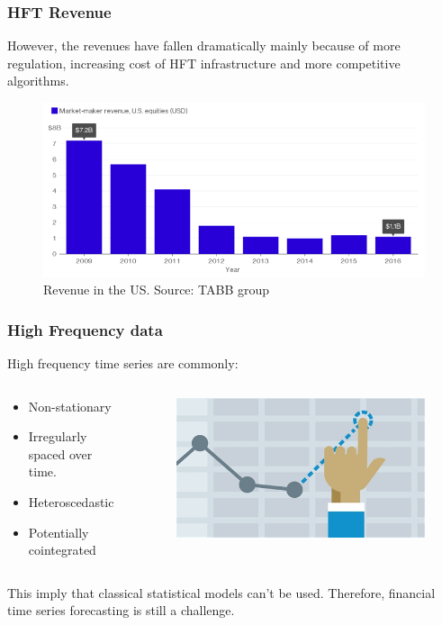 \documentclass{beamer}
\begin{document}
\begin{frame}
\frametitle{HFT Revenue}
However, the revenues have fallen dramatically mainly because of more regulation, increasing cost of HFT infrastructure and more competitive algorithms.
\begin{figure}
\includegraphics[width=0.7\paperwidth]{img/HFTmarket2}
\caption{Revenue in the US. Source: TABB group}
\end{figure}
\end{frame}


\begin{frame}
\frametitle{High Frequency data}
High frequency time series are commonly:
\begin{columns}
\begin{column}{0.5\textwidth}
\begin{itemize}
\item Non-stationary
\item Irregularly spaced over time.
\item Heteroscedastic
\item Potentially cointegrated
\end{itemize}
\end{column}
\begin{column}{0.5\textwidth}
\begin{figure}
\includegraphics[width=0.35\paperwidth]{img/forecast}
\end{figure}
\end{column}
\end{columns}
\vspace{5mm}
This imply that classical statistical models can't be used. Therefore, financial time series forecasting is still a challenge.
\end{frame}
\end{document}
